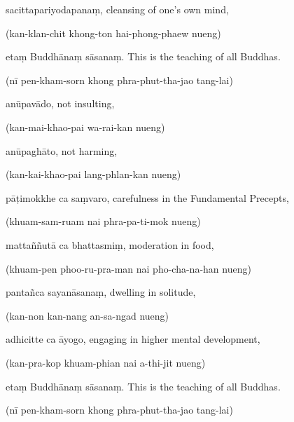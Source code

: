 \begin{chantsubsection}
  \chantnote
    {sacittapariyodapanaṃ,}
  \chantindent
    {cleansing of one's own mind,}
    \par
  \chantindent
    {(kan-klan-chit khong-ton hai-phong-phaew nueng)}
  \chantgap

  \chantnote
    {etaṃ Buddhānaṃ sāsanaṃ.}
  \chantindent
    {This is the teaching of all Buddhas.}
  \par\chantindent
    {(nī pen-kham-sorn khong phra-phut-tha-jao tang-lai)}
  \chantgap

  \clearpage
  
  \chantnote
    {anūpavādo,}
  \chantindent
    {not insulting,}
  \par\chantindent
    {(kan-mai-khao-pai wa-rai-kan nueng)}
  \chantgap

  \chantnote
    {anūpaghāto,}
  \chantindent
    {not harming,}
  \par\chantindent
    {(kan-kai-khao-pai lang-phlan-kan nueng)}
  \chantgap

  \chantnote
    {pāṭimokkhe ca saṃvaro,}
  \chantindent
    {carefulness in the Fundamental Precepts,}
  \par\chantindent
    {(khuam-sam-ruam nai phra-pa-ti-mok nueng)}
  \chantgap

  \chantnote
    {mattaññutā ca bhattasmiṃ,}
  \chantindent
    {moderation in food,}
  \par\chantindent
    {(khuam-pen phoo-ru-pra-man nai pho-cha-na-han nueng)}
  \chantgap

  \chantnote
    {pantañca sayanāsanaṃ,}
  \chantindent
    {dwelling in solitude,}
  \par\chantindent
    {(kan-non kan-nang an-sa-ngad nueng)}
  \chantgap

  \chantnote
    {adhicitte ca āyogo,}
  \chantindent
    {engaging in higher mental development,}
  \par\chantindent
    {(kan-pra-kop khuam-phian nai a-thi-jit nueng)}
  \chantgap

  \chantnote
    {etaṃ Buddhānaṃ sāsanaṃ.}
  \chantindent
    {This is the teaching of all Buddhas.}
  \par\chantindent
    {(nī pen-kham-sorn khong phra-phut-tha-jao tang-lai)}
\end{chantsubsection}

    


